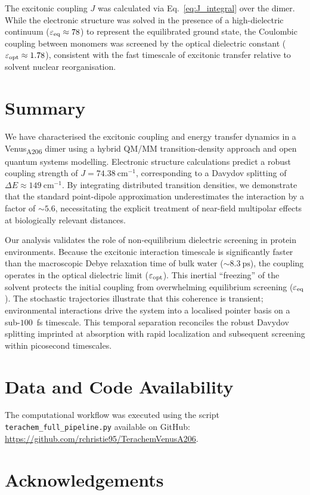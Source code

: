 \documentclass[journal=jpclcd, manuscript=letter, layout=twocolumn, doi=true]{achemso}
\begin{document}
The excitonic coupling $J$ was calculated via Eq.~\eqref{eq:J_integral} over the dimer. While the electronic structure was solved in the presence of a high-dielectric continuum ($\varepsilon_{\rm eq}\approx 78$) to represent the equilibrated ground state, the Coulombic coupling between monomers was screened by the optical dielectric constant ($\varepsilon_{\rm opt} \approx 1.78$), consistent with the fast timescale of excitonic transfer relative to solvent nuclear reorganisation.

\section{Summary}

We have characterised the excitonic coupling and energy transfer dynamics in a Venus\textsubscript{A206} dimer using a hybrid QM/MM transition-density approach and open quantum systems modelling. Electronic structure calculations predict a robust coupling strength of $J = 74.38~\mathrm{cm^{-1}}$, corresponding to a Davydov splitting of $\Delta E \approx 149~\mathrm{cm^{-1}}$. By integrating distributed transition densities, we demonstrate that the standard point-dipole approximation underestimates the interaction by a factor of $\sim 5.6$, necessitating the explicit treatment of near-field multipolar effects at biologically relevant distances.

Our analysis validates the role of non-equilibrium dielectric screening in protein environments. Because the excitonic interaction timescale is significantly faster than the macroscopic Debye relaxation time of bulk water ($\sim 8.3~\mathrm{ps}$), the coupling operates in the optical dielectric limit ($\varepsilon_{\rm opt}$). This inertial ``freezing'' of the solvent protects the initial coupling from overwhelming equilibrium screening ($\varepsilon_{\rm eq}$). The stochastic trajectories illustrate that this coherence is transient; environmental interactions drive the system into a localised pointer basis on a sub-$100$~fs timescale. This temporal separation reconciles the robust Davydov splitting imprinted at absorption with rapid localization and subsequent screening within picosecond timescales.

\section{Data and Code Availability}

The computational workflow was executed using the script \texttt{terachem\_full\_pipeline.py} available on GitHub: \url{https://github.com/rchristie95/TerachemVenusA206}. 

\section{Acknowledgements}


\end{document}
